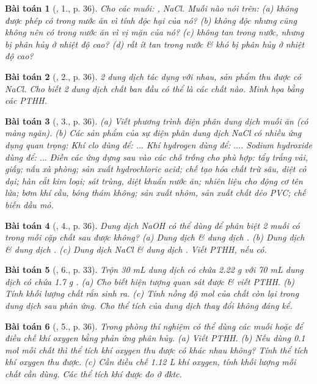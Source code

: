 \documentclass{article}
\newtheorem{baitoan}{Bài toán}
\begin{document}
\begin{baitoan}[\cite{SGK_Hoa_Hoc_9}, 1., p. 36]
	Cho các muối: {\rm{}, NaCl}. Muối nào nói trên: (a) không được phép có trong nước ăn vì tính độc hại của nó? (b) không độc nhưng cũng không nên có trong nước ăn vì vị mặn của nó? (c) không tan trong nước, nhưng bị phân hủy ở nhiệt độ cao? (d) rất ít tan trong nước \& khó bị phân hủy ở nhiệt độ cao?
\end{baitoan}

\begin{baitoan}[\cite{SGK_Hoa_Hoc_9}, 2., p. 36]
	2 dung dịch tác dụng với nhau, sản phẩm thu được có {\rm NaCl}. Cho biết 2 dung dịch chất ban đầu có thể là các chất nào. Minh họa bằng các PTHH.
\end{baitoan}

\begin{baitoan}[\cite{SGK_Hoa_Hoc_9}, 3., p. 36]
	(a) Viết phương trình điện phân dung dịch muối ăn (có màng ngăn). (b) Các sản phẩm của sự điện phân dung dịch {\rm NaCl} có nhiều ứng dụng quan trọng: Khí clo dùng để: $\ldots$ Khí hydrogen dùng để: $\ldots$. Sodium hydroxide dùng để: $\ldots$ Điền các ứng dựng sau vào các chỗ trống cho phù hợp: tẩy trắng vải, giấy; nấu xà phòng; sản xuất hydrochloric acid; chế tạo hóa chất trừ sâu, diệt cỏ dại; hàn cắt kim loại; sát trùng, diệt khuẩn nước ăn; nhiên liệu cho động cơ tên lửa; bơm khí cầu, bóng thám không; sản xuất nhôm, sản xuất chất dẻo PVC; chế biến dầu mỏ.
\end{baitoan}

\begin{baitoan}[\cite{SGK_Hoa_Hoc_9}, 4., p. 36]
	Dung dịch {\rm NaOH} có thể dùng để phân biệt 2 muối có trong mỗi cặp chất sau được không? (a) Dung dịch {\rm{}} \& dung dịch {\rm{}}. (b) Dung dịch {\rm{}} \& dung dịch {\rm{}}. (c) Dung dịch {\rm NaCl} \& dung dịch {\rm{}}. Viết {\rm PTHH}, nếu có.
\end{baitoan}

\begin{baitoan}[\cite{SGK_Hoa_Hoc_9}, 6., p. 33]
	Trộn {\rm30 mL} dung dịch có chứa {\rm2.22 g } với {\rm70 mL} dung dịch có chứa {\rm1.7 g }. (a) Cho biết hiện tượng quan sát được \& viết PTHH. (b) Tính khối lượng chất rắn sinh ra. (c) Tính nồng độ mol của chất còn lại trong dung dịch sau phản ứng. Cho thể tích của dung dịch thay đổi không đáng kể.
\end{baitoan}

\begin{baitoan}[\cite{SGK_Hoa_Hoc_9}, 5., p. 36]
	Trong phòng thí nghiệm có thể dùng các muối {\rm{}} hoặc {\rm{}} để điều chế khí oxygen bằng phản ứng phân hủy. (a) Viết {\rm PTHH}. (b) Nếu dùng {\rm0.1 mol} mỗi chất thì thể tích khí oxygen thu được có khác nhau không? Tính thể tích khí oxygen thu được. (c) Cần điều chế {\rm1.12 L} khí oxygen, tính khối lượng mỗi chất cần dùng. Các thể tích khí được đo ở đktc.
\end{baitoan}
\end{document}
